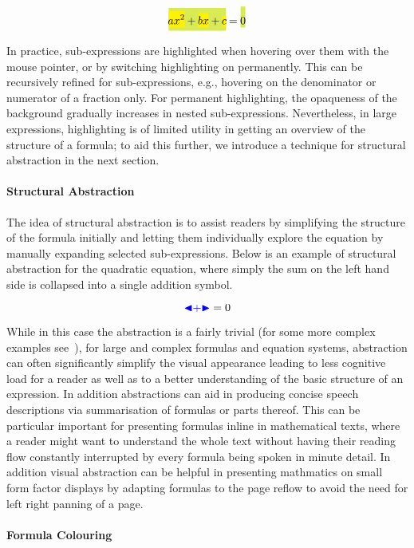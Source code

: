 \documentclass{sig-alternate}
\def\collapse#1{\textcolor{blue}{\ensuremath{\mathord{\blacktriangleleft}
\mathord{#1}
\mathord{\blacktriangleright}}}}
\begin{document}
\def\cb#1{\colorbox{yellow}{\ensuremath{\!\!\displaystyle#1\!\!}}}
\def\cc#1{\colorbox{GreenYellow}{\ensuremath{\!\!\displaystyle#1\!\!}}}
\[\cc{\cb{ax^2} + \cb{bx} + \cb{c}} = \cc{\rule[3ex]{0pt}{0pt}0}\]

In practice, sub-expressions are highlighted when hovering over them with the
mouse pointer, or by switching highlighting on permanently. This can be
recursively refined for sub-expressions, e.g., hovering on the denominator or
numerator of a fraction only. For permanent highlighting, the opaqueness of the
background gradually increases in nested sub-expressions. Nevertheless, in large
expressions, highlighting is of limited utility in getting an overview of the structure
of a formula; to aid this further, we introduce a technique for
structural abstraction in the next section.

\paragraph{Structural Abstraction}

The idea of structural abstraction is to assist readers by simplifying the
structure of the formula initially and letting them individually explore the
equation by manually expanding selected sub-expressions. Below is an example of
structural abstraction for the quadratic equation, where simply the sum on the
left hand side is collapsed into a single addition symbol.

\[ \collapse{+}=0\]

While in this case the abstraction is a fairly trivial (for some more complex
examples see~\cite{cervone2016towards}), for large and complex formulas and
equation systems, abstraction can often significantly simplify the visual
appearance leading to less cognitive load for a reader as well as to a better
understanding of the basic structure of an expression. In addition abstractions
can aid in producing concise speech descriptions via summarisation of formulas
or parts thereof. This can be particular important for presenting formulas
inline in mathematical texts, where a reader might want to understand the whole
text without having their reading flow constantly interrupted by every formula
being spoken in minute detail. In addition visual abstraction can be helpful in
presenting mathmatics on small form factor displays by adapting formulas to the
page reflow to avoid the need for left right panning of a page.


\paragraph{Formula Colouring}
\end{document}
